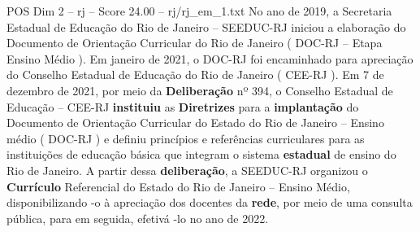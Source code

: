\begin{textsample}{POS Dim 2 – rj – Score 24.00 – rj/rj\_em\_1.txt}
No ano de 2019, a Secretaria Estadual de Educação do Rio de Janeiro – SEEDUC-RJ iniciou a elaboração do Documento de Orientação Curricular do Rio de Janeiro ( DOC-RJ – Etapa Ensino Médio ).
Em janeiro de 2021, o DOC-RJ foi encaminhado para apreciação do Conselho Estadual de Educação do Rio de Janeiro ( CEE-RJ ).
Em 7 de dezembro de 2021, por meio da \textbf{Deliberação} nº 394, o Conselho Estadual de Educação – CEE-RJ \textbf{instituiu} as \textbf{Diretrizes} para a \textbf{implantação} do Documento de Orientação Curricular do Estado do Rio de Janeiro – Ensino médio ( DOC-RJ ) e definiu princípios e referências curriculares para as instituições de educação básica que integram o sistema \textbf{estadual} de ensino do Rio de Janeiro.
A partir dessa \textbf{deliberação}, a SEEDUC-RJ organizou o \textbf{Currículo} Referencial do Estado do Rio de Janeiro – Ensino Médio, disponibilizando -o à apreciação dos docentes da \textbf{rede}, por meio de uma consulta pública, para em seguida, efetivá -lo no ano de 2022.

\end{textsample}
